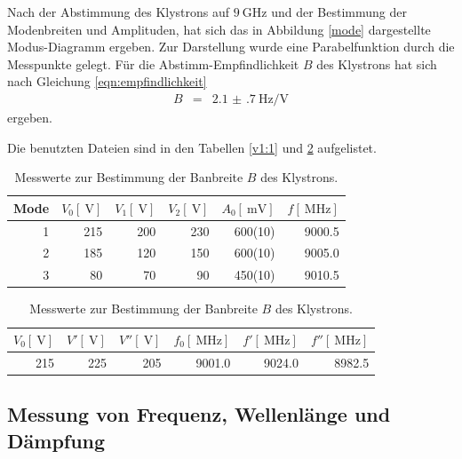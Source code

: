 Nach der Abstimmung des Klystrons auf $\SI{9}{\giga\hertz}$ und der Bestimmung der Modenbreiten und Amplituden, hat sich das in Abbildung \ref{mode} dargestellte Modus-Diagramm ergeben.
Zur Darstellung wurde eine Parabelfunktion durch die Messpunkte gelegt.
Für die Abstimm-Empfindlichkeit $B$ des Klystrons hat sich nach Gleichung \eqref{eqn:empfindlichkeit}
\begin{eqnarray}
	B &=& \SI{2.1(7)}{\hertz\per\volt}
\end{eqnarray}
ergeben.

Die benutzten Dateien sind in den Tabellen \ref{v1:1} und \ref{v1:2} aufgelistet.

\begin{table}
\centering
\caption{Messwerte zur Darstellung des Modus-Diagramms.}
\begin{tabular}{r r r r r r}
	Mode & $V_\text{0}[\SI{}{\volt}]$ & $V_\text{1}[\SI{}{\volt}]$ & $V_\text{2}[\SI{}{\volt}]$ & $A_\text{0}[\SI{}{\milli\volt}]$ & $f[\SI{}{\mega\hertz}]$ \\
	\hline
	\hline
	1 & 215 & 200 & 230 & {600(10)} & 9000.5\\
	2 & 185 & 120 & 150 & {600(10)} & 9005.0\\
	3 &  80 &  70 &  90 & {450(10)} & 9010.5\\
	\hline
\end{tabular}
\label{v1:1}
\caption{Messwerte zur Bestimmung der Banbreite $B$ des Klystrons.}
\begin{tabular}{r r r r r r}
	$V_\text{0}[\SI{}{\volt}]$ & $V'[\SI{}{\volt}]$ & $V''[\SI{}{\volt}]$ & $f_\text{0}[\SI{}{\mega\hertz}]$  & $f'[\SI{}{\mega\hertz}]$ & $f''[\SI{}{\mega\hertz}]$ \\
	\hline
	\hline
	215 & 225 & 205 & 9001.0 & 9024.0 & 8982.5\\
	\hline
\end{tabular}
\label{v1:2}
\end{table}

\FloatBarrier

\subsection{Messung von Frequenz, Wellenlänge und Dämpfung} %
\label{sub:messung_von_frequenz_wellenlaenge_und_daempfung}

